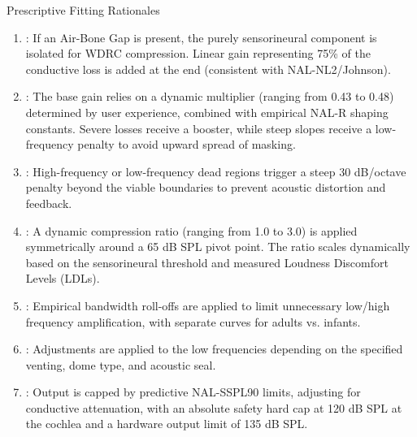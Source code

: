 \documentclass[letterpaper]{book}
\begin{document}
\begin{Details}
\begin{SubSection}{Prescriptive Fitting Rationales}
\begin{itemize}
\begin{enumerate}
\item{} : If an Air-Bone Gap is present, the purely sensorineural component is isolated for WDRC compression. Linear gain representing 75\% of the conductive loss is added at the end (consistent with NAL-NL2/Johnson).
\item{} : The base gain relies on a dynamic multiplier (ranging from 0.43 to 0.48) determined by user experience, combined with empirical NAL-R shaping constants. Severe losses receive a booster, while steep slopes receive a low-frequency penalty to avoid upward spread of masking.
\item{} : High-frequency or low-frequency dead regions trigger a steep 30 dB/octave penalty beyond the viable boundaries to prevent acoustic distortion and feedback.
\item{} : A dynamic compression ratio (ranging from 1.0 to 3.0) is applied symmetrically around a 65 dB SPL pivot point. The ratio scales dynamically based on the sensorineural threshold and measured Loudness Discomfort Levels (LDLs).
\item{} : Empirical bandwidth roll-offs are applied to limit unnecessary low/high frequency amplification, with separate curves for adults vs. infants.
\item{} : Adjustments are applied to the low frequencies depending on the specified venting, dome type, and acoustic seal.
\item{} : Output is capped by predictive NAL-SSPL90 limits, adjusting for conductive attenuation, with an absolute safety hard cap at 120 dB SPL at the cochlea and a hardware output limit of 135 dB SPL.

\end{enumerate}


\end{itemize}


\end{SubSection}

\end{Details}
%
\end{document}
